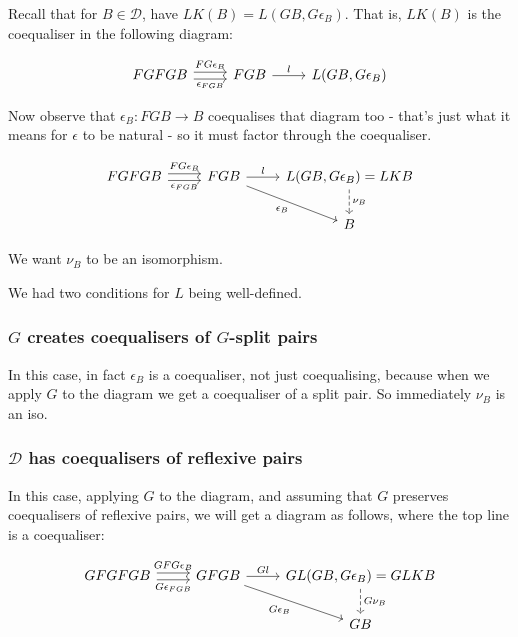 \documentclass[11pt]{amsart}
\begin{document}
Recall that for $B \in \mathcal{D}$, have $LK(B) = L(GB, G \epsilon_B)$.
That is, $LK(B)$ is the coequaliser in the following diagram:

\[
\begin{tikzcd}
FGFGB
    \arrow[r, shift left, "FG \epsilon_B"]
    \arrow[r, shift right, "\epsilon_{FGB}"']
& FGB
    \arrow[r, "l"]
& L(GB, G \epsilon_B)
\end{tikzcd}
\]

Now observe that $\epsilon_B: FGB \to B$ coequalises that diagram too - that's just what it means for $\epsilon$ to be natural - so it must factor through the coequaliser.

\[
\begin{tikzcd}
FGFGB
    \arrow[r, shift left, "FG \epsilon_B"]
    \arrow[r, shift right, "\epsilon_{FGB}"']
& FGB
    \arrow[r, "l"]
    \arrow[dr, "\epsilon_B"']
& L(GB, G \epsilon_B) = LKB
    \arrow[d, dashrightarrow, "\nu_B"]
\\
& & B
\end{tikzcd}
\]

We want $\nu_B$ to be an isomorphism.

We had two conditions for $L$ being well-defined.

\subsubsection{$G$ creates coequalisers of $G$-split pairs}
In this case, in fact $\epsilon_B$ is a coequaliser, not just coequalising, because when we apply $G$ to the diagram we get a coequaliser of a split pair.
So immediately $\nu_B$ is an iso.

\subsubsection{$\mathcal{D}$ has coequalisers of reflexive pairs}
In this case, applying $G$ to the diagram, and assuming that $G$ preserves coequalisers of reflexive pairs, we will get a diagram as follows, where the top line is a coequaliser:

\[
\begin{tikzcd}
GFGFGB
    \arrow[r, shift left, "GFG \epsilon_B"]
    \arrow[r, shift right, "G \epsilon_{FGB}"']
& GFGB
    \arrow[r, "Gl"]
    \arrow[dr, "G\epsilon_B"']
& GL(GB, G \epsilon_B) = GLKB
    \arrow[d, dashrightarrow, "G \nu_B"]
\\
& & GB
\end{tikzcd}
\]
\end{document}
